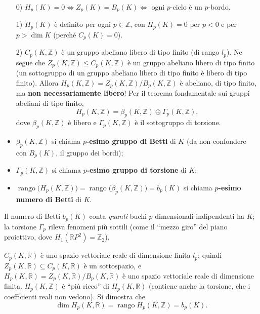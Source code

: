 \begin{observacion}
\begin{enumerate}
    \item[0)] $H_p(K) = 0 \iff Z_p(K) = B_p(K) \iff$ ogni $p$-ciclo \`e un $p$-bordo.
    \item[1)] $H_p(K)$ \`e definito per ogni $p \in \mathbb{Z}$, con $H_p(K) = 0$ per $p < 0$ e per $p > \dim K$ (perch\'e $C_p(K) = 0$).
    \item[2)] $C_p(K, \mathbb{Z})$ \`e un gruppo abeliano libero di tipo finito (di rango $l_p$). Ne segue che $Z_p(K, \mathbb{Z}) \leqslant C_p(K, \mathbb{Z})$ \`e un gruppo abeliano libero di tipo finito (un sottogruppo di un gruppo abeliano libero di tipo finito \`e libero di tipo finito). Allora $H_p(K, \mathbb{Z}) = Z_p(K, \mathbb{Z}) / B_p(K, \mathbb{Z})$ \`e abeliano, di tipo finito, ma \textbf{non necessariamente libero}! Per il teorema fondamentale sui gruppi abeliani di tipo finito,
    \[
    H_p(K, \mathbb{Z}) = \beta_p(K, \mathbb{Z}) \oplus \Gamma_p(K, \mathbb{Z}),
    \]
    dove $\beta_p(K, \mathbb{Z})$ \`e libero e $\Gamma_p(K, \mathbb{Z})$ \`e il sottogruppo di torsione.
\end{enumerate}
\end{observacion}

\begin{definicion}
\begin{itemize}
    \item $\beta_p(K, \mathbb{Z})$ si chiama \textbf{$p$-esimo gruppo di Betti} di $K$ (da non confondere con $B_p(K)$, il gruppo dei bordi);
    \item $\Gamma_p(K, \mathbb{Z})$ si chiama \textbf{$p$-esimo gruppo di torsione} di $K$;
    \item $\operatorname{rango}\big(H_p(K, \mathbb{Z})\big) = \operatorname{rango}\big(\beta_p(K, \mathbb{Z})\big) = b_p(K)$ si chiama \textbf{$p$-esimo numero di Betti} di $K$.
\end{itemize}
\end{definicion}

\begin{intuizione}
Il numero di Betti $b_p(K)$ conta \emph{quanti} buchi $p$-dimensionali indipendenti ha $K$; la torsione $\Gamma_p$ rileva fenomeni pi\`u sottili (come il ``mezzo giro'' del piano proiettivo, dove $H_1(\mathbb{R}P^2) = \mathbb{Z}_2$).
\end{intuizione}


\begin{observacion}
$C_p(K, \mathbb{R})$ \`e uno spazio vettoriale reale di dimensione finita $l_p$; quindi $Z_p(K, \mathbb{R}) \subseteq C_p(K, \mathbb{R})$ \`e un sottospazio, e $H_p(K, \mathbb{R}) = Z_p(K, \mathbb{R}) / B_p(K, \mathbb{R})$ \`e uno spazio vettoriale reale di dimensione finita. $H_p(K, \mathbb{Z})$ \`e ``pi\`u ricco'' di $H_p(K, \mathbb{R})$ (contiene anche la torsione, che i coefficienti reali non vedono). Si dimostra che
\[
\dim H_p(K, \mathbb{R}) = \operatorname{rango} H_p(K, \mathbb{Z}) = b_p(K).
\]
\end{observacion}

